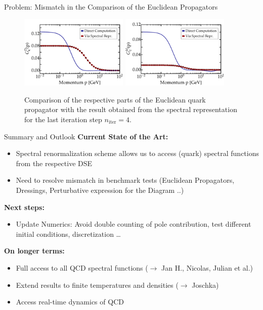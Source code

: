\begin{frame}{Problem: Mismatch in the Comparison of the Euclidean Propagators}
	 \begin{figure}[t] 
\hfill
	\centering
	\includegraphics[width = 0.46\textwidth, trim= 4em 0 0 0]{figs/plots/BenchmarkPlotVec}
\hfill
	\includegraphics[width = 0.46\textwidth, trim= 4em 0 0 0 0]{figs/plots/BenchmarkPlotScal}
\hfill 
	\caption{Comparison of the respective parts of the Euclidean quark propagator with the result obtained from the spectral representation for the last iteration step $n_{\mathrm{iter}}=4$.}
\label{fig:specfunc_results}
\end{figure}
\end{frame}



\begin{frame}{Summary and Outlook}
\textbf{Current State of the Art:}
\begin{itemize}
	\item \alert{Spectral renormalization scheme} allows us to access (quark) spectral functions from the respective DSE
	\item Need to resolve mismatch in benchmark tests (Euclidean Propagators, Dressings, Perturbative expression for the Diagram ..)
\end{itemize}
\textbf{Next steps:}
\begin{itemize}
	\item Update Numerics: Avoid double counting of pole contribution, test different initial conditions, discretization \dots
\end{itemize}
\textbf{On longer terms:}
\begin{itemize}
	\item Full access to all QCD spectral functions ($\rightarrow$ Jan H., Nicolas, Julian et al.)
	\item Extend results to finite temperatures and densities ($\rightarrow$  Joschka)
	\item Access real-time dynamics of QCD
\end{itemize}
\end{frame}